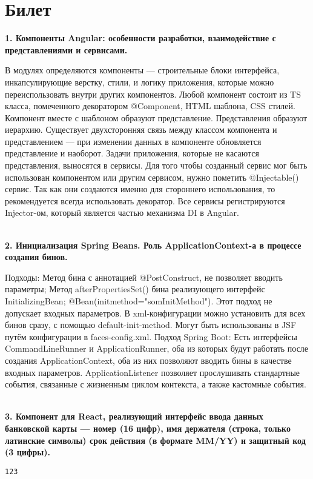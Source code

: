 \documentclass{article}
\newcommand{\bil}[5]{%
        \section{Билет}
        \textbf{1. #1}

        #4
        \\
        \textbf{2. #2}
        
        #5
        \\
        \textbf{3. #3}
}
\begin{document}
\bil{Компоненты Angular: особенности разработки, взаимодействие с представлениями и сервисами.}
{Инициализация Spring Beans. Роль ApplicationContext-а в процессе создания бинов.}
{Компонент для React, реализующий интерфейс ввода данных банковской карты — номер (16 цифр), имя держателя (строка, только латинские символы) срок действия (в формате MM/YY) и защитный код (3 цифры).}{
    В модулях определяются компоненты — строительные блоки интерфейса, инкапсулирующие верстку, стили, и логику приложения, которые можно переиспользовать внутри других компонентов. 
    Любой компонент состоит из TS класса, помеченного декоратором @Component, HTML шаблона, CSS стилей. 
    Компонент вместе с шаблоном образуют представление. 
    Представления образуют иерархию. Существует двухсторонняя связь между классом компонента и представлением — при изменении данных в компоненте обновляется представление и наоборот. 
    Задачи приложения, которые не касаются представления, выносятся в сервисы. 
    Для того чтобы созданный сервис мог быть использован компонентом или другим сервисом, нужно пометить @Injectable() сервис. 
    Так как они создаются именно для стороннего использования, то рекомендуется всегда использовать декоратор. 
    Все сервисы регистрируются Injector-ом, который является частью механизма DI в Angular.
}{
    Подходы: Метод бина с аннотацией @PostConstruct, не позволяет вводить параметры; 
    Метод afterPropertiesSet() бина реализующего интерфейс InitializingBean; 
    @Bean(initmethod="somInitMethod"). Этот подход не допускает входных параметров. 
    В xml-конфигурации можно установить для всех бинов сразу, с помощью default-init-method. 
    Могут быть использованы в JSF путём конфигурации в faces-config.xml. 
    Подход Spring Boot: Есть интерфейсы CommandLineRunner и ApplicationRunner, оба из которых будут работать после создания ApplicationContext, оба из них позволяют вводить бины в качестве входных параметров. 
    ApplicationListener позволяет прослушивать стандартные события, связанные с жизненным циклом контекста, а также кастомные события.
}
\begin{lstlisting}[frame=single, basicstyle=\ttfamily, breaklines=true, breakatwhitespace=true, postbreak=\mbox{\textcolor{red}{$\hookrightarrow$}\space}]
123
\end{lstlisting}
\end{document}
